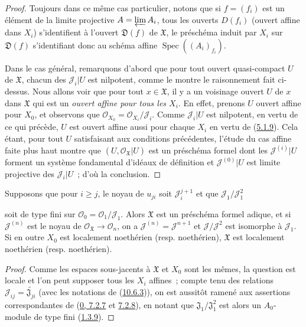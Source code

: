\begin{proof}
Toujours dans ce même cas particulier, notons que si $f=(f_i)$ est un
élément de la limite projective $A=\varprojlim A_i$, tous les ouverts
$D(f_i)$ (ouvert affine dans $X_i$) s'identifient à l'ouvert
$\mathfrak{D}(f)$ de $\mathfrak{X}$, le préschéma induit par $X_i$ sur
$\mathfrak{D}(f)$ s'identifiant donc au schéma affine
$\operatorname{Spec}((A_i)_{f_i})$.

Dans le cas général, remarquons d'abord que pour tout ouvert quasi-compact
$U$ de $\mathfrak{X}$, chacun des $\mathscr{J}_i|U$ est nilpotent, comme
le montre le raisonnement fait ci-dessus. Nous allons voir que pour tout
$x\in\mathfrak{X}$, il y a un voisinage ouvert $U$ de $x$ dans
$\mathfrak{X}$ qui est un \emph{ouvert affine pour tous les $X_i$}. En
effet, prenons $U$ ouvert affine pour $X_0$, et observons que
$\mathscr{O}_{X_0}=\mathscr{O}_{X_i}/\mathscr{J}_i$. Comme
$\mathscr{J}_i|U$ est nilpotent, en vertu de ce qui précède, $U$ est
ouvert affine aussi pour chaque $X_i$ en vertu de
(\hyperref[I.5.1.9-fr]{5.1.9}). Cela étant, pour tout $U$ satisfaisant
aux conditions précédentes, l'étude du cas affine faite plus haut montre
que $(U,\mathscr{O}_{\mathfrak{X}}|U)$ est un préschéma formel dont les
$\mathscr{J}^{(i)}|U$ forment un système fondamental d'idéaux de
définition et $\mathscr{J}^{(0)}|U$ est limite projective des
$\mathscr{J}_i|U$~; d'où la conclusion.
\end{proof}

\begin{corollary}[10.6.4]
\label{I.10.6.4-fr}
Supposons que pour $i\geq j$, le noyau de $u_{ji}$ soit
$\mathscr{J}_i^{j+1}$ et que $\mathscr{J}_1/\mathscr{J}_1^2$


soit de type fini sur
$\mathscr{O}_0=\mathscr{O}_1/\mathscr{J}_1$. Alors $\mathfrak{X}$ est
un préschéma formel adique, et si $\mathscr{J}^{(n)}$ est le noyau de
$\mathscr{O}_{\mathfrak{X}}\to\mathscr{O}_n$, on a
$\mathscr{J}^{(n)}=\mathscr{J}^{n+1}$ et
$\mathscr{J}/\mathscr{J}^2$ est isomorphe à $\mathscr{J}_1$. Si en
outre $X_0$ est localement noethérien (resp. noethérien),
$\mathfrak{X}$ est localement noethérien (resp. noethérien).
\end{corollary}

\begin{proof}
Comme les espaces sous-jacents à $\mathfrak{X}$ et $X_0$ sont les mêmes,
la question est locale et l'on peut supposer tous les $X_i$ affines~;
compte tenu des relations
$\mathscr{J}_{ij}=\widetilde{\mathfrak{J}_{ji}}$ (avec les notations
de (\hyperref[I.10.6.3-fr]{10.6.3})), on est aussitôt ramené aux
assertions correspondantes de
(\hyperref[0.7.2.7-fr]{0, 7.2.7} et
\hyperref[0.7.2.8-fr]{7.2.8}), en notant que
$\mathfrak{J}_1/\mathfrak{J}_1^2$ est alors un $A_0$-module de type
fini (\hyperref[I.1.3.9-fr]{1.3.9}).
\end{proof}

